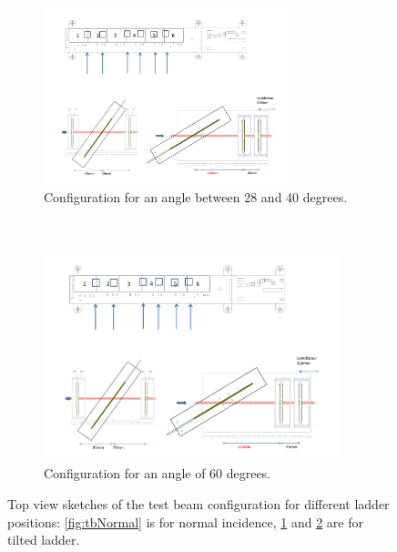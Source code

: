 \begin{figure}[!h]
      \begin{subfigure}[t]{0.45\textwidth}
        \centering
        \includegraphics[width=0.8\textwidth]{Pictures/deformation/tb_cern_11_sketch_tilted.pdf}
        \caption{Configuration for an angle between 28 and 40 degrees.}
        \label{fig:tilt36}
      \end{subfigure}
      ~%
      \begin{subfigure}[t]{0.45\textwidth}
        \centering
        \includegraphics[width=0.95\textwidth]{Pictures/deformation/tb_cern_11_sketch_tilted120mm.pdf}
        \caption{Configuration for an angle of 60 degrees.}
        \label{fig:tilt60}
      \end{subfigure}
      \caption{Top view sketches of the test beam configuration for different ladder positions: \ref{fig:tbNormal} is for normal incidence, \ref{fig:tilt36} and \ref{fig:tilt60} are for tilted ladder.}
      \label{fig:tilt}
    \end{figure}   

